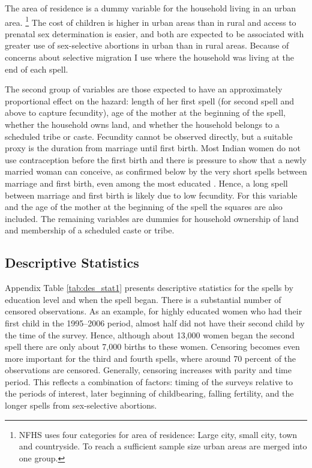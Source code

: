 \documentclass[12pt,letterpaper]{article}
\begin{document}
The area of residence is a dummy variable for the household living in
an urban area.%
\footnote{
NFHS uses four categories for area of residence: Large city, small city, town
and countryside.
To reach a sufficient sample size urban areas are merged into one group.
}
The cost of children is higher in urban areas than in rural and access to prenatal
sex determination is easier, and both are expected to be associated with
greater use of sex-selective abortions in urban than in rural areas.
Because of concerns about selective migration I use where the household was living
at the end of each spell.


The second group of variables are those expected to have an approximately 
proportional effect on the hazard: 
length of her first spell (for second spell and above to capture fecundity), 
age of the mother at the beginning of the spell, 
whether the household owns land, 
and whether the household belongs to a scheduled tribe or caste.
Fecundity cannot be observed directly, but a suitable proxy is the 
duration from marriage until first birth.
Most Indian women do not use contraception before the first birth
and there is pressure to show that a newly married woman can conceive,
as confirmed below by the very short spells between marriage and first birth,
even among the most educated \citep{dyson83,Sethuraman2007,Dommaraju2009}.
Hence, a long spell between marriage and first birth is likely due to low fecundity.
For this variable and the age of the mother at the beginning of the spell 
the squares are also included.
The remaining variables are dummies for household ownership of land and membership
of a scheduled caste or tribe.


\subsection{Descriptive Statistics}

Appendix Table \ref{tab:des_stat1} presents descriptive statistics for
the spells by education level and when the spell began.
There is a substantial number of censored observations.
As an example, for highly educated women who had their first child in the 1995--2006
period, almost half did not have their second child by the time of the survey.
Hence, although about 13,000 women began the second spell 
there are only about 7,000 births to these women.
Censoring becomes even more important for the third and fourth
spells, where around 70 percent of the observations are censored.
Generally, censoring increases with parity and time period.
This reflects a combination of factors: timing of the surveys
relative to the periods of interest, later beginning of childbearing, 
falling fertility, and the longer spells from sex-selective abortions.
\end{document}
